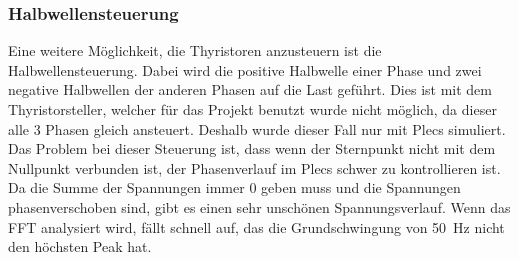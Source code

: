 \newpage
\subsubsection*{Halbwellensteuerung}
Eine weitere Möglichkeit, die Thyristoren anzusteuern ist die Halbwellensteuerung. Dabei wird die positive Halbwelle einer Phase und zwei negative Halbwellen der anderen Phasen auf die Last geführt. Dies ist mit dem Thyristorsteller, welcher für das Projekt benutzt wurde nicht möglich, da dieser alle 3 Phasen gleich ansteuert. Deshalb wurde dieser Fall nur mit Plecs simuliert. Das Problem bei dieser Steuerung ist, dass wenn der Sternpunkt nicht mit dem Nullpunkt verbunden ist, der Phasenverlauf im Plecs schwer zu kontrollieren ist. Da die Summe der Spannungen immer 0 geben muss und die Spannungen phasenverschoben sind, gibt es einen sehr unschönen Spannungsverlauf. Wenn das FFT analysiert wird, fällt schnell auf, das die Grundschwingung von \SI{50}{Hz} nicht den höchsten Peak hat.


